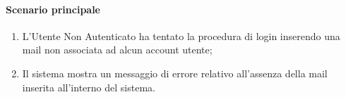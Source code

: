 \paragraph*{Scenario principale}
\begin{enumerate}
  \item L’Utente Non Autenticato ha tentato la procedura di login inserendo una mail non associata ad alcun account utente;
  \item Il sistema mostra un messaggio di errore relativo all’assenza della mail inserita all’interno del sistema.     
\end{enumerate}
